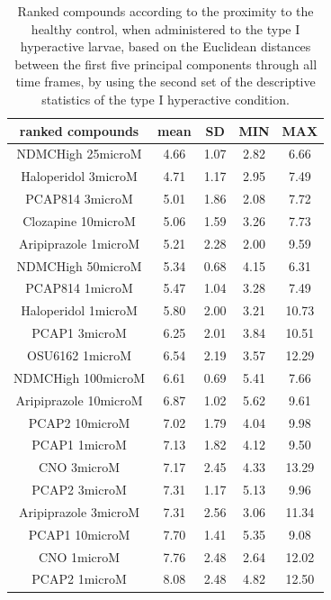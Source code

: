 \begin{table}[h!]\tiny
\centering
\caption{Ranked compounds according to the proximity to the healthy control, when administered to the type I hyperactive larvae, based on the Euclidean distances between the first five principal components through all time frames, by using the second set of the descriptive statistics of the type I hyperactive condition.}
\begin{tabular}{|c|c|c|c|c|}
\hline
ranked compounds             & mean & SD   & MIN  & MAX   \\ \hline
NDMCHigh 25microM     & 4.66  & 1.07  & 2.82 & 6.66  \\ \hline
Haloperidol 3microM   & 4.71  & 1.17  & 2.95 & 7.49  \\ \hline
PCAP814 3microM       & 5.01  & 1.86  & 2.08 & 7.72  \\ \hline
Clozapine 10microM    & 5.06  & 1.59  & 3.26 & 7.73  \\ \hline
Aripiprazole 1microM  & 5.21  & 2.28  & 2.00    & 9.59  \\ \hline
NDMCHigh 50microM     & 5.34  & 0.68  & 4.15 & 6.31  \\ \hline
PCAP814 1microM       & 5.47  & 1.04  & 3.28 & 7.49  \\ \hline
Haloperidol 1microM   & 5.80   & 2.00     & 3.21 & 10.73 \\ \hline
PCAP1 3microM         & 6.25  & 2.01  & 3.84 & 10.51 \\ \hline
OSU6162 1microM       & 6.54  & 2.19  & 3.57 & 12.29 \\ \hline
NDMCHigh 100microM    & 6.61  & 0.69  & 5.41 & 7.66  \\ \hline
Aripiprazole 10microM & 6.87  & 1.02  & 5.62 & 9.61  \\ \hline
PCAP2 10microM        & 7.02  & 1.79  & 4.04 & 9.98  \\ \hline
PCAP1 1microM         & 7.13  & 1.82  & 4.12 & 9.50   \\ \hline
CNO 3microM           & 7.17  & 2.45  & 4.33 & 13.29 \\ \hline
PCAP2 3microM         & 7.31  & 1.17  & 5.13 & 9.96  \\ \hline
Aripiprazole 3microM  & 7.31  & 2.56  & 3.06 & 11.34 \\ \hline
PCAP1 10microM        & 7.70   & 1.41  & 5.35 & 9.08  \\ \hline
CNO 1microM           & 7.76  & 2.48  & 2.64 & 12.02 \\ \hline
PCAP2 1microM         & 8.08  & 2.48  & 4.82 & 12.50  \\ \hline

\end{tabular}
\end{table}
